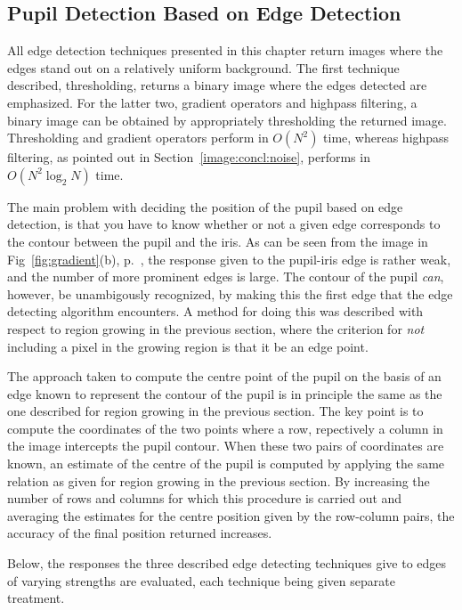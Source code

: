 \subsection{Pupil Detection Based on Edge Detection}
\label{image:concl:edge}

All edge detection techniques presented in this chapter return images
where the edges stand out on a relatively uniform background.  The
first technique described, thresholding, returns a binary image where
the edges detected are emphasized.  For the latter two, gradient
operators and highpass filtering, a binary image can be obtained by
appropriately thresholding the returned image.  Thresholding and
gradient operators perform in $O(N^{2})$ time, whereas highpass
filtering, as pointed out in Section~\ref{image:concl:noise}, performs
in $O(N^{2}\log_{2}N)$ time.

The main problem with deciding the position of the pupil based on edge
detection, is that you have to know whether or not a given edge
corresponds to the contour between the pupil and the iris.  As can be
seen from the image in Fig~\ref{fig:gradient}(b),
p.~\pageref{fig:gradient}, the response given to the pupil-iris edge
is rather weak, and the number of more prominent edges is large.  The
contour of the pupil {\em can\/}, however, be unambigously recognized,
by making this the first edge that the edge detecting algorithm
encounters.  A method for doing this was described with respect to
region growing in the previous section, where the criterion for {\em
  not\/} including a pixel in the growing region is that it be an edge
point.

The approach taken to compute the centre point of the pupil on the
basis of an edge known to represent the contour of the pupil is in
principle the same as the one described for region growing in the
previous section.  The key point is to compute the coordinates of the
two points where a row, repectively a column in the image intercepts
the pupil contour.  When these two pairs of coordinates are known, an
estimate of the centre of the pupil is computed by applying the same
relation as given for region growing in the previous section.  By
increasing the number of rows and columns for which this procedure is
carried out and averaging the estimates for the centre position given
by the row-column pairs, the accuracy of the final position returned
increases.

Below, the responses the three described edge detecting techniques
give to edges of varying strengths are evaluated, each technique being
given separate treatment.

